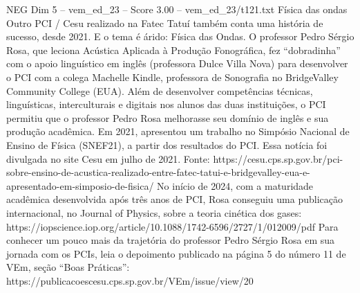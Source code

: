 \begin{textsample}{NEG Dim 5 – vem\_ed\_23 – Score 3.00 – vem\_ed\_23/t121.txt}  \label{ex:f5_neg_109}
Física das ondas Outro PCI / Cesu realizado na Fatec Tatuí também conta uma história de sucesso, desde 2021.
E o tema é árido: Física das Ondas.
O professor Pedro Sérgio Rosa, que leciona Acústica Aplicada à Produção Fonográfica, fez “dobradinha” com o apoio linguístico em inglês (professora Dulce Villa Nova) para desenvolver o PCI com a colega Machelle Kindle, professora de Sonografia no BridgeValley Community College (EUA).
Além de desenvolver competências técnicas, linguísticas, interculturais e digitais nos alunos das duas instituições, o PCI permitiu que o professor Pedro Rosa melhorasse seu domínio de inglês e sua produção acadêmica.
Em 2021, apresentou um trabalho no Simpósio Nacional de Ensino de Física (SNEF21), a partir dos resultados do PCI.
Essa notícia foi divulgada no site Cesu em julho de 2021.
Fonte: https://cesu.cps.sp.gov.br/pci-sobre-ensino-de-acustica-realizado-entre-fatec-tatui-e-bridgevalley-eua-e-apresentado-em-simposio-de-fisica/ No início de 2024, com a maturidade acadêmica desenvolvida após três anos de PCI, Rosa conseguiu uma publicação internacional, no Journal of Physics, sobre a teoria cinética dos gases: https://iopscience.iop.org/article/10.1088/1742-6596/2727/1/012009/pdf Para conhecer um pouco mais da trajetória do professor Pedro Sérgio Rosa em sua jornada com os PCIs, leia o depoimento publicado na página 5 do número 11 de VEm, seção “Boas Práticas”: https://publicacoescesu.cps.sp.gov.br/VEm/issue/view/20

\end{textsample}
